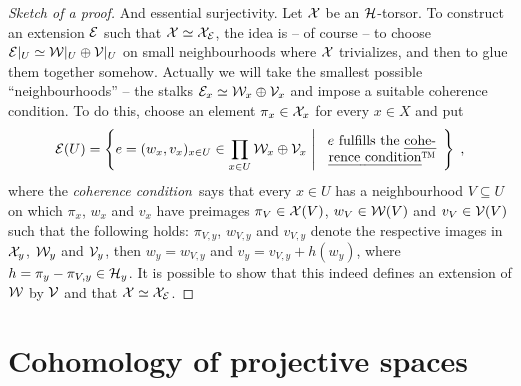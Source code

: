 \documentclass[a4paper,parskip=half,numbers=enddot, DIV=12]{scrreprt}
\begin{document}
\begin{proof}[Sketch of a proof]
	And essential surjectivity. Let $\mathcal{X}$ be an $\mathcal{H}$-torsor. To construct an extension $\mathcal{E}$ such that $\mathcal{X}\simeq \mathcal{X}_{\mathcal{E}}$, the idea is -- of course -- to choose $\mathcal{E}|_U\simeq \mathcal{W}|_U\oplus\mathcal{V}|_U$ on small neighbourhoods where $\mathcal{X}$ trivializes, and then to glue them together somehow. Actually we will take the smallest possible ``neighbourhoods'' -- the stalks $\mathcal{E}_x\simeq\mathcal{W}_x\oplus\mathcal{V}_x$ and impose a suitable coherence condition. To do this, choose an element $\pi_x\in\mathcal{X}_x$ for every $x\in X$ and put
	\begin{align*}
	\Ee(U)=\left\{e=(w_x,v_x)_{x\in U}\in \prod_{x\in U}\Ww_x\oplus\Vv_x\st\begin{array}{c}
	e\text{ fulfills the \emph{cohe-}}\\
	\text{\emph{rence condition}\texttrademark}
	\end{array}\right\}\;,
	\end{align*}
	where the \emph{coherence condition}\texttrademark\ says that every $x\in U$ has a neighbourhood $V\subseteq U$ on which $\pi_x$, $w_x$ and $v_x$ have preimages $\pi_V\in \mathcal{X}(V)$, $w_V\in\mathcal{W}(V)$ and $v_V\in\mathcal{V}(V)$ such that the following holds: $\pi_{V,y}$, $w_{V,y}$ and $v_{V,y}$ denote the respective images in $\mathcal{X}_y$, $\mathcal{W}_y$ and $\mathcal{V}_y$, then $w_y=w_{V,y}$ and $v_y=v_{V,y}+h(w_y)$, where $h=\pi_y-\pi_{V,y}\in\mathcal{H}_y$. It is possible to show that this indeed defines an extension of $\mathcal{W}$ by $\mathcal{V}$ and that $\mathcal{X}\simeq\mathcal{X}_{\mathcal{E}}$.
\end{proof}

\chapter{Cohomology of projective spaces}
\end{document}
